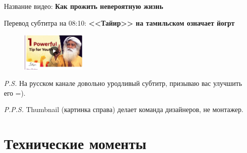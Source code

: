 \documentclass[
a4paper, %
12pt, %
article,
onecolumn, %
openany, %
]{memoir}
\begin{document}
Название видео: \textbf{Как прожить невероятную жизнь}

Перевод субтитра на 08:10: \textbf{<<Тайир>> на тамильском означает йогрт}


\begin{figure}
    \begin{center}
        \includegraphics[width=0.28\textwidth]{thumbnail}
    \end{center}
\end{figure}

\emph{P.S.} На русском канале довольно уродливый субтитр, призываю вас улучшить его =).

\emph{P.P.S.} Thumbnail (картинка справа) делает команда дизайнеров, не монтажер.


\newpage
\section{Технические моменты}
\end{document}
